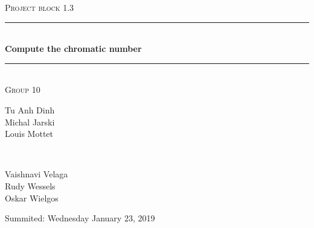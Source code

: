 \documentclass[a4paper]{report}
\begin{document}
	\begin{titlepage} 
		\newcommand{\HRule}{\rule{\linewidth}{0.5mm}}
		
		\center 
		
		\textsc{\large Project block 1.3}\\[0.5cm] 
		
		\HRule\\[0.4cm]
		
		{\huge\bfseries Compute the chromatic number}\\[0.4cm] 
		
		\HRule\\[1.5cm]
		
		\textsc{\large Group 10}\\[0.5cm]

		\begin{minipage}{0.6\textwidth}
			\begin{flushleft}
				Tu Anh Dinh\\Michal Jarski\\Louis Mottet
			\end{flushleft}
		\end{minipage}
		~
		\begin{minipage}{0.3\textwidth}
			\begin{flushleft}
				Vaishnavi Velaga\\Rudy Wessels\\Oskar Wielgos
			\end{flushleft}
		\end{minipage}
		
		\vspace{2cm}
		
		Summited: Wednesday January 23, 2019
		
		
	\end{titlepage}
	
	
	
	
	
\end{document}
